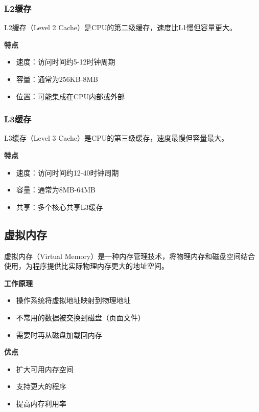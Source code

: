 \documentclass{article}
\begin{document}
\subsubsection{L2缓存}

L2缓存（Level 2 Cache）是CPU的第二级缓存，速度比L1慢但容量更大。

\textbf{特点}
\begin{itemize}
    \item 速度：访问时间约5-12时钟周期
    \item 容量：通常为256KB-8MB
    \item 位置：可能集成在CPU内部或外部
\end{itemize}

\subsubsection{L3缓存}

L3缓存（Level 3 Cache）是CPU的第三级缓存，速度最慢但容量最大。

\textbf{特点}
\begin{itemize}
    \item 速度：访问时间约12-40时钟周期
    \item 容量：通常为8MB-64MB
    \item 共享：多个核心共享L3缓存
\end{itemize}

\subsection{虚拟内存}

虚拟内存（Virtual Memory）是一种内存管理技术，将物理内存和磁盘空间结合使用，为程序提供比实际物理内存更大的地址空间。

\textbf{工作原理}
\begin{itemize}
    \item 操作系统将虚拟地址映射到物理地址
    \item 不常用的数据被交换到磁盘（页面文件）
    \item 需要时再从磁盘加载回内存
\end{itemize}

\textbf{优点}
\begin{itemize}
    \item 扩大可用内存空间
    \item 支持更大的程序
    \item 提高内存利用率
\end{itemize}
\end{document}
